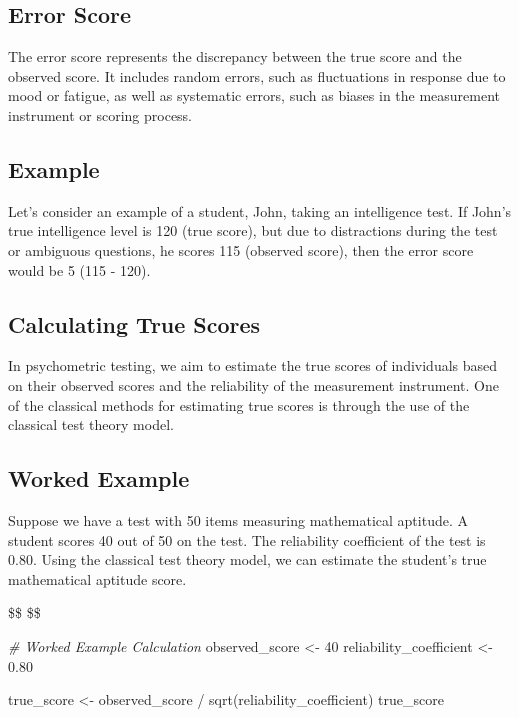 \documentclass[
]{article}
\newenvironment{Shaded}{\begin{snugshade}}{\end{snugshade}}
\newcommand{\CommentTok}[1]{\textcolor[rgb]{0.56,0.35,0.01}{\textit{#1}}}
\newcommand{\DecValTok}[1]{\textcolor[rgb]{0.00,0.00,0.81}{#1}}
\newcommand{\FloatTok}[1]{\textcolor[rgb]{0.00,0.00,0.81}{#1}}
\newcommand{\FunctionTok}[1]{\textcolor[rgb]{0.00,0.00,0.00}{#1}}
\newcommand{\NormalTok}[1]{#1}
\newcommand{\OtherTok}[1]{\textcolor[rgb]{0.56,0.35,0.01}{#1}}
\newcommand{\SpecialCharTok}[1]{\textcolor[rgb]{0.00,0.00,0.00}{#1}}
\begin{document}
\hypertarget{error-score}{%
\subsection{Error Score}\label{error-score}}

The error score represents the discrepancy between the true score and
the observed score. It includes random errors, such as fluctuations in
response due to mood or fatigue, as well as systematic errors, such as
biases in the measurement instrument or scoring process.

\hypertarget{example}{%
\subsection{Example}\label{example}}

Let’s consider an example of a student, John, taking an intelligence
test. If John’s true intelligence level is 120 (true score), but due to
distractions during the test or ambiguous questions, he scores 115
(observed score), then the error score would be 5 (115 - 120).

\hypertarget{calculating-true-scores}{%
\subsection{Calculating True Scores}\label{calculating-true-scores}}

In psychometric testing, we aim to estimate the true scores of
individuals based on their observed scores and the reliability of the
measurement instrument. One of the classical methods for estimating true
scores is through the use of the classical test theory model.

\hypertarget{worked-example}{%
\subsection{Worked Example}\label{worked-example}}

Suppose we have a test with 50 items measuring mathematical aptitude. A
student scores 40 out of 50 on the test. The reliability coefficient of
the test is 0.80. Using the classical test theory model, we can estimate
the student’s true mathematical aptitude score.

\$\$ \$\$

\begin{Shaded}
\begin{Highlighting}[]
\CommentTok{\# Worked Example Calculation}
\NormalTok{observed\_score }\OtherTok{\textless{}{-}} \DecValTok{40}
\NormalTok{reliability\_coefficient }\OtherTok{\textless{}{-}} \FloatTok{0.80}

\NormalTok{true\_score }\OtherTok{\textless{}{-}}\NormalTok{ observed\_score }\SpecialCharTok{/} \FunctionTok{sqrt}\NormalTok{(reliability\_coefficient)}
\NormalTok{true\_score}
\end{Highlighting}
\end{Shaded}
\end{document}
